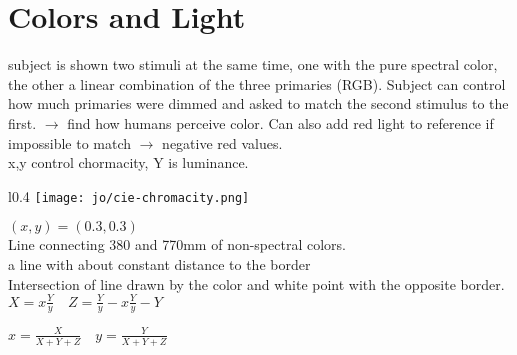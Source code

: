 \section{Colors and Light}
 subject is shown two stimuli at the same time, one with the pure spectral color, the other a linear combination of the three primaries (RGB). Subject can control how much primaries were dimmed and asked to match the second stimulus to the first. $\rightarrow$ find how humans perceive color. Can also add red light to reference if impossible to match $\rightarrow$ negative red values. \\
 x,y control chormacity, Y is luminance. 
\begin{wrapfigure}[9]{l}{0.4\columnwidth} %
    \texttt{[image: jo/cie-chromacity.png]}
\end{wrapfigure}
 $(x,y) = (0.3,0.3)$ \\
 Line connecting 380 and 770mm of non-spectral colors. \\
 a line with about constant distance to the border \\
 Intersection of line drawn by the color and white point with the opposite border. 
$X = x \frac{Y}{y} \quad Z = \frac{Y}{y} - x \frac{Y}{y} - Y$

$x = \frac{X}{X + Y + Z} \quad y = \frac{Y}{X + Y + Z}$

